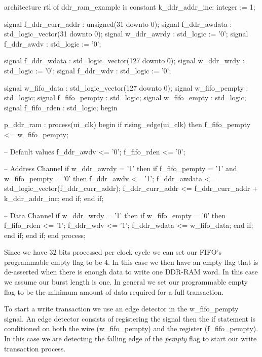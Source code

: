 \begin{VHDLlisting}[tabsize=4]
architecture rtl of ddr_ram_example is
    constant k_ddr_addr_inc: integer := 1;
    
    signal f_ddr_curr_addr : unsigned(31 downto 0);
    signal f_ddr_awdata    : std_logic_vector(31 downto 0);
    signal w_ddr_awrdy     : std_logic := '0';
    signal f_ddr_awdv      : std_logic := '0';
    
    signal f_ddr_wdata     : std_logic_vector(127 downto 0);
    signal w_ddr_wrdy      : std_logic := '0';
    signal f_ddr_wdv       : std_logic := '0';
    
    signal w_fifo_data     : std_logic_vector(127 downto 0); 
    signal w_fifo_pempty   : std_logic;
    signal f_fifo_pempty   : std_logic;
    signal w_fifo_empty    : std_logic;
    signal f_fifo_rden     : std_logic;	
begin

p_ddr_ram : process(ui_clk)
begin
    if rising_edge(ui_clk) then
        f_fifo_pempty <= w_fifo_pempty;
        
        -- Default values
        f_ddr_awdv <= '0';
        f_fifo_rden <= '0';
        
        -- Address Channel
        if w_ddr_awrdy = '1' then
            if f_fifo_pempty = '1' and w_fifo_pempty = '0' then
                f_ddr_awdv <= '1';
                f_ddr_awdata <= std_logic_vector(f_ddr_curr_addr);
                f_ddr_curr_addr <= f_ddr_curr_addr + k_ddr_addr_inc;
            end if;		
        end if;
        
        -- Data Channel
        if w_ddr_wrdy = '1' then
            if w_fifo_empty = '0' then
                f_fifo_rden <= '1';
                f_ddr_wdv <= '1';
                f_ddr_wdata <= w_fifo_data;
            end if;			
        end if;
    end if;
end process;
\end{VHDLlisting}

Since we have $32$ bits processed per clock cycle we can set our \ac{FIFO}'s programmable empty flag to be $4$. In this case we then have an empty flag that is de-asserted when there is enough data to write one \ac{DDR}-\ac{RAM} word. In this case we assume our burst length is one. In general we set our programmable empty flag to be the minimum amount of data required for a full transaction. 

To start a write transaction we use an edge detector in the w\_fifo\_pempty signal. An edge detector consists of registering the signal then the if statement is conditioned on both the wire (w\_fifo\_pempty) and the register (f\_fifo\_pempty). In this case we are detecting the falling edge of the \emph{pempty} flag to start our write transaction process.

